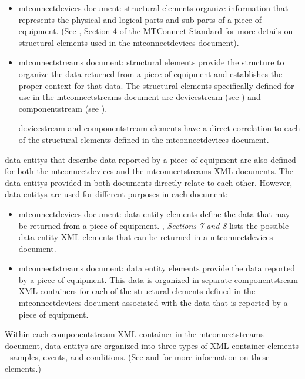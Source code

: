 \documentclass{mtconnect}	%
\begin{document}
\begin{itemize}

\item \gls{mtconnectdevices} document: \glspl{structural element} organize information that represents the physical and logical parts and sub-parts of a piece of equipment.  (See , Section 4 of the MTConnect Standard for more details on \glspl{structural element} used in the \gls{mtconnectdevices} document).  

\item \gls{mtconnectstreams} document: \glspl{structural element} provide the structure to organize the data returned from a piece of equipment and establishes the proper context for that data.  The \glspl{structural element} specifically defined for use in the \gls{mtconnectstreams} document are \gls{devicestream} (see ) and \gls{componentstream} (see ).   

\gls{devicestream} and \gls{componentstream} elements have a direct correlation to each of the \glspl{structural element} defined in the \gls{mtconnectdevices} document.
\end{itemize}

\glspl{data entity} that describe data reported by a piece of equipment are also defined for both the \gls{mtconnectdevices} and the \gls{mtconnectstreams} XML documents.  The \glspl{data entity} provided in both documents directly relate to each other.  However, \glspl{data entity} are used for different purposes in each document:

\begin{itemize}
\item \gls{mtconnectdevices} document: \gls{data entity} elements define the data that may be returned from a piece of equipment.  , \textit{Sections 7 and 8} lists the possible \gls{data entity} XML elements that can be returned in a \gls{mtconnectdevices} document.  

\item \gls{mtconnectstreams} document: \gls{data entity} elements provide the data reported by a piece of equipment.  This data is organized in separate \gls{componentstream} XML containers for each of the \glspl{structural element} defined in the \gls{mtconnectdevices} document associated with the data that is reported by a piece of equipment.  
\end{itemize}

Within each \gls{componentstream} XML container in the \gls{mtconnectstreams} document, \glspl{data entity} are organized into three types of XML container elements - \glspl{sample}, \glspl{event}, and \glspl{condition}.  (See  and  for more information on these elements.)
\end{document}
